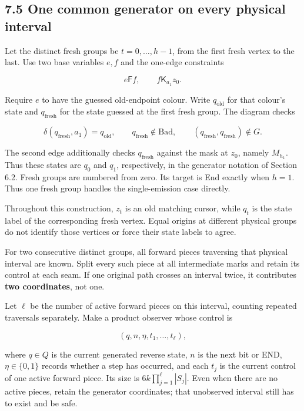 \documentclass[
  11pt,
  a4paper,
]{article}
\begin{document}
\subsection{7.5 One common generator on every physical
interval}\label{one-common-generator-on-every-physical-interval}

Let the distinct fresh groups be \(t=0,\ldots,h-1\), from the first
fresh vertex to the last. Use two base variables \(e,f\) and the
one-edge constraints

\[e\mathrel{\mathsf F}f,\qquad
f\mathrel{\mathsf K_{a_1}}z_0.\]

Require \(e\) to have the guessed old-endpoint colour. Write
\(q_{\mathrm{old}}\) for that colour's state and \(q_{\mathrm{fresh}}\)
for the state guessed at the first fresh group. The diagram checks

\[\delta(q_{\mathrm{fresh}},a_1)=q_{\mathrm{old}},\qquad
q_{\mathrm{fresh}}\notin\mathrm{Bad},\qquad
(q_{\mathrm{fresh}},q_{\mathrm{fresh}})\notin G.\]

The second edge additionally checks \(q_{\mathrm{fresh}}\) against the
mask at \(z_0\), namely \(M_{h_1}\). Thus these states are \(q_0\) and
\(q_1\), respectively, in the generator notation of Section 6.2. Fresh
groups are numbered from zero. Its target is End exactly when \(h=1\).
Thus one fresh group handles the single-emission case directly.

Throughout this construction, \(z_t\) is an old matching cursor, while
\(q_t\) is the state label of the corresponding fresh vertex. Equal
origins at different physical groups do not identify those vertices or
force their state labels to agree.

For two consecutive distinct groups, all forward pieces traversing that
physical interval are known. Split every such piece at all intermediate
marks and retain its control at each seam. If one original path crosses
an interval twice, it contributes \textbf{two coordinates}, not one.

Let \(\ell\) be the number of active forward pieces on this interval,
counting repeated traversals separately. Make a product observer whose
control is

\[(q,n,\eta,t_1,\ldots,t_\ell),\tag{7.6}\]

where \(q\in Q\) is the current generated reverse state, \(n\) is the
next bit or END, \(\eta\in\{0,1\}\) records whether a step has occurred,
and each \(t_j\) is the current control of one active forward piece. Its
size is \(6k\prod_{j=1}^\ell|S_j|\). Even when there are no active
pieces, retain the generator coordinates; that unobserved interval still
has to exist and be safe.
\end{document}
